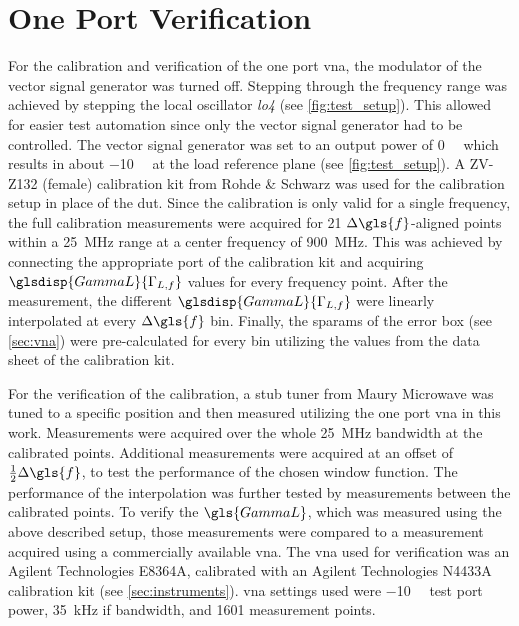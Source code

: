 \documentclass[12pt,a4paper,parskip=full,abstract=true,BCOR=12mm]{scrreprt}
\def\device#1{\mbox{\textit{#1}}}
\begin{document}

\section{One Port  Verification}
\label{sec:vna_verify}

For the calibration and verification of the one port \gls{vna}, the modulator of
the vector signal generator was turned off. Stepping through the frequency range
was achieved by stepping the local oscillator \device{lo4} (see \cref{fig:test_setup}).
This allowed for easier test automation since only the vector signal generator had to
be controlled. The vector signal generator was set to an output power of \SI{0}{\deci\belm}
which results in about \SI{-10}{\deci\belm} at the load reference plane (see \cref{fig:test_setup}). A ZV-Z132 (female) calibration kit from Rohde \& Schwarz was used for the calibration
setup in place of the \gls{dut}. Since the calibration is only valid for a single frequency, the full
calibration measurements were acquired for 21 $\Delta{}\gls{f}$-aligned points within a
\SI{25}{\mega\hertz} range at a center frequency of \SI{900}{\mega\hertz}. This
was achieved by connecting the appropriate port of the calibration kit and acquiring
$\glsdisp{GammaL}{\Gamma_{L,f}}$ values for every frequency point. After the measurement, the different $\glsdisp{GammaL}{\Gamma_{L,f}}$ were linearly
interpolated at every $\Delta{}\gls{f}$ bin. Finally, the \glspl{sparam} of
the error box (see \cref{sec:vna}) were pre-calculated for every bin utilizing the values
from the data sheet of the calibration kit\cite{zv-z132}.

For the verification of the calibration, a stub tuner from Maury Microwave was tuned to a specific position and
then measured utilizing the one port \gls{vna} in this work. Measurements were acquired over
the whole \SI{25}{\mega\hertz} bandwidth at the calibrated points. Additional measurements
were acquired at an offset of $\frac{1}{2}\Delta{}\gls{f}$, to test the performance
of the chosen window function. The performance of the interpolation was further tested by
measurements between the calibrated points. To verify the $\gls{GammaL}$, which was measured using the
above described setup, those measurements were compared to a measurement acquired using a
commercially available \gls{vna}. The \gls{vna} used for verification was an Agilent Technologies E8364A,
calibrated with an Agilent Technologies N4433A calibration kit (see \cref{sec:instruments}). \gls{vna}
settings used were \SI{-10}{\deci\belm} test port power, \SI{35}{\kilo\hertz} \gls{if} bandwidth, and
\num{1601} measurement points.
\end{document}
